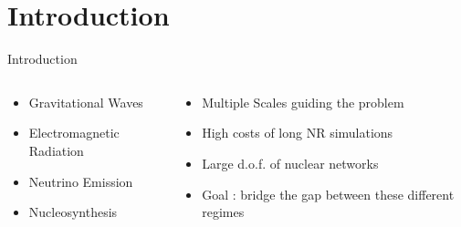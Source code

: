 \section{Introduction}



\begin{frame}{Introduction}
 \begin{columns}

\begin{column}{0.5\textwidth}
\begin{tcolorbox}[
    colback=white,
    colframe=blue,
    colbacktitle=blue!50!black!50,
    title=Astrophysical Relevance of BNS, 
    fonttitle=\bfseries,
    rounded corners,
    boxrule=1pt,
    left=2mm, right=2mm, top=1mm, bottom=1mm
]
    \begin{itemize}
    \scriptsize
    \item Gravitational Waves
    \item Electromagnetic Radiation
    \item Neutrino Emission
    \item Nucleosynthesis
\end{itemize}

\end{tcolorbox}
\end{column}

\begin{column}{0.5\textwidth}

\begin{tcolorbox}[
    colback=white,
    colframe=blue,
    colbacktitle=blue!50!black!50,
    title=Motivations and Goals,
    fonttitle=\bfseries,
    rounded corners,
    boxrule=1pt,
    left=2mm, right=2mm, top=1mm, bottom=1mm
]
\begin{itemize}
   \scriptsize
    \item Multiple Scales guiding the problem
    \item High costs of long NR simulations
    \item Large d.o.f. of nuclear networks
    \item Goal : bridge the gap between these different regimes
\end{itemize}
\end{tcolorbox}


\end{column}
\end{columns}
\end{frame}
